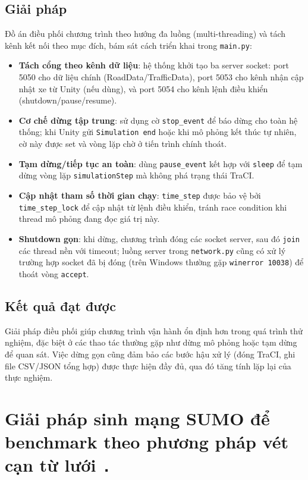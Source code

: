 \documentclass[../DoAn.tex]{subfiles}
\begin{document}
\subsection{Giải pháp}
Đồ án điều phối chương trình theo hướng đa luồng (multi-threading) và tách kênh kết nối theo mục đích, bám sát cách triển khai trong \texttt{main.py}:
\begin{itemize}[leftmargin=2em]
	\item \textbf{Tách cổng theo kênh dữ liệu}: hệ thống khởi tạo ba server socket: port 5050 cho dữ liệu chính (RoadData/TrafficData), port 5053 cho kênh nhận cập nhật xe từ Unity (nếu dùng), và port 5054 cho kênh lệnh điều khiển (shutdown/pause/resume).
	\item \textbf{Cơ chế dừng tập trung}: sử dụng cờ \texttt{stop\_event} để báo dừng cho toàn hệ thống; khi Unity gửi \texttt{Simulation end} hoặc khi mô phỏng kết thúc tự nhiên, cờ này được set và vòng lặp chờ ở tiến trình chính thoát.
	\item \textbf{Tạm dừng/tiếp tục an toàn}: dùng \texttt{pause\_event} kết hợp với \texttt{sleep} để tạm dừng vòng lặp \texttt{simulationStep} mà không phá trạng thái TraCI.
	\item \textbf{Cập nhật tham số thời gian chạy}: \texttt{time\_step} được bảo vệ bởi \texttt{time\_step\_lock} để cập nhật từ lệnh điều khiển, tránh race condition khi thread mô phỏng đang đọc giá trị này.
	\item \textbf{Shutdown gọn}: khi dừng, chương trình đóng các socket server, sau đó \texttt{join} các thread nền với timeout; luồng server trong \texttt{network.py} cũng có xử lý trường hợp socket đã bị đóng (trên Windows thường gặp \texttt{winerror 10038}) để thoát vòng \texttt{accept}.
\end{itemize}

\subsection{Kết quả đạt được}
Giải pháp điều phối giúp chương trình vận hành ổn định hơn trong quá trình thử nghiệm, đặc biệt ở các thao tác thường gặp như dừng mô phỏng hoặc tạm dừng để quan sát. Việc dừng gọn cũng đảm bảo các bước hậu xử lý (đóng TraCI, ghi file CSV/JSON tổng hợp) được thực hiện đầy đủ, qua đó tăng tính lặp lại của thực nghiệm.

\section{Giải pháp sinh mạng SUMO để benchmark theo phương pháp vét cạn từ lưới \texttt{.}}\label{sec:naive_map_generation}
\end{document}
